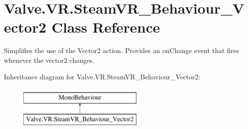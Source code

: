 \hypertarget{class_valve_1_1_v_r_1_1_steam_v_r___behaviour___vector2}{}\section{Valve.\+V\+R.\+Steam\+V\+R\+\_\+\+Behaviour\+\_\+\+Vector2 Class Reference}
\label{class_valve_1_1_v_r_1_1_steam_v_r___behaviour___vector2}


Simplifies the use of the Vector2 action. Provides an on\+Change event that fires whenever the vector2 changes.  


Inheritance diagram for Valve.\+V\+R.\+Steam\+V\+R\+\_\+\+Behaviour\+\_\+\+Vector2\+:\begin{figure}[H]
\begin{center}
\leavevmode
\includegraphics[height=2.000000cm]{class_valve_1_1_v_r_1_1_steam_v_r___behaviour___vector2}
\end{center}
\end{figure}
